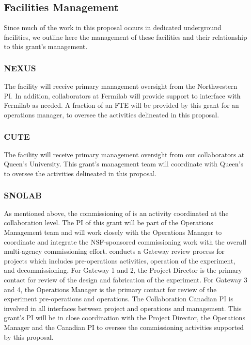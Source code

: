 %

\subsection{Facilities Management}
Since much of the work in this proposal occurs in dedicated underground facilities, we outline here the management of these facilities and their relationship to this grant's management.

\subsubsection{NEXUS}
The \nexus facility will receive primary management oversight from the Northwestern PI. In addition, \SuperCDMS collaborators at Fermilab will provide support to interface with Fermilab as needed. A fraction of an FTE will be provided by this grant for an operations manager, to oversee the activities delineated in this proposal. 

\subsubsection{CUTE}

The \cute facility will receive primary management oversight from our collaborators at Queen's University. This grant's management team will coordinate with Queen's to oversee the \cute activities delineated in this proposal.

\subsubsection{SNOLAB}

As mentioned above, the commissioning of \scs is an activity coordinated at the collaboration level. The PI of this grant will be part of the Operations Management team and will work closely with the \scs Operations Manager to coordinate and integrate the NSF-sponsored commissioning work with the overall multi-agency commissioning effort. \SNOLAB conducts a Gateway review process for projects which includes pre-operations activities, operation of the experiment, and decommissioning. For Gateway 1 and 2, the Project Director is the primary contact for review of the design and fabrication of the \scs experiment. For Gateway 3 and 4, the Operations Manager is the primary contact for review of the experiment pre-operations and operations. The Collaboration Canadian PI is involved in all interfaces between \scs project and operations and \SNOLAB management.  This grant's PI will be in close coordination with the Project Director, the Operations Manager and the Canadian PI to oversee the commissioning activities supported by this proposal.
